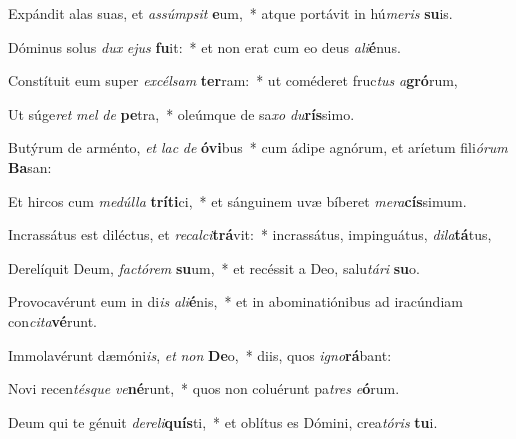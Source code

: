 \item Expándit alas suas, et \textit{as}\textit{súmp}\textit{sit} \textbf{e}um,~* atque portávit in hú\textit{me}\textit{ris} \textbf{su}is.
\item Dóminus solus \textit{dux} \textit{e}\textit{jus} \textbf{fu}it:~* et non erat cum eo deus \textit{a}\textit{li}\textbf{é}nus.
\item Constítuit eum super \textit{ex}\textit{cél}\textit{sam} \textbf{ter}ram:~* ut coméderet fruc\textit{tus} \textit{a}\textbf{gró}rum,
\item Ut súge\textit{ret} \textit{mel} \textit{de} \textbf{pe}tra,~* oleúmque de sa\textit{xo} \textit{du}\textbf{rís}simo.
\item Butýrum de arménto, \textit{et} \textit{lac} \textit{de} \textbf{ó}\textbf{vi}bus~* cum ádipe agnórum, et aríetum fili\textit{ó}\textit{rum} \textbf{Ba}san:
\item Et hircos cum \textit{me}\textit{dúl}\textit{la} \textbf{trí}\textbf{ti}ci,~* et sánguinem uvæ bíberet \textit{me}\textit{ra}\textbf{cís}simum.
\item Incrassátus est diléctus, et \textit{re}\textit{cal}\textit{ci}\textbf{trá}vit:~* incrassátus, impinguátus, \textit{di}\textit{la}\textbf{tá}tus,
\item Derelíquit Deum, \textit{fac}\textit{tó}\textit{rem} \textbf{su}um,~* et recéssit a Deo, salu\textit{tá}\textit{ri} \textbf{su}o.
\item Provocavérunt eum in di\textit{is} \textit{a}\textit{li}\textbf{é}nis,~* et in abominatiónibus ad iracúndiam con\textit{ci}\textit{ta}\textbf{vé}runt.
\item Immolavérunt dæmóni\textit{is}, \textit{et} \textit{non} \textbf{De}o,~* diis, quos \textit{i}\textit{gno}\textbf{rá}bant:
\item Novi recen\textit{tés}\textit{que} \textit{ve}\textbf{né}runt,~* quos non coluérunt pa\textit{tres} \textit{e}\textbf{ó}rum.
\item Deum qui te génuit \textit{de}\textit{re}\textit{li}\textbf{quís}ti,~* et oblítus es Dómini, crea\textit{tó}\textit{ris} \textbf{tu}i.
